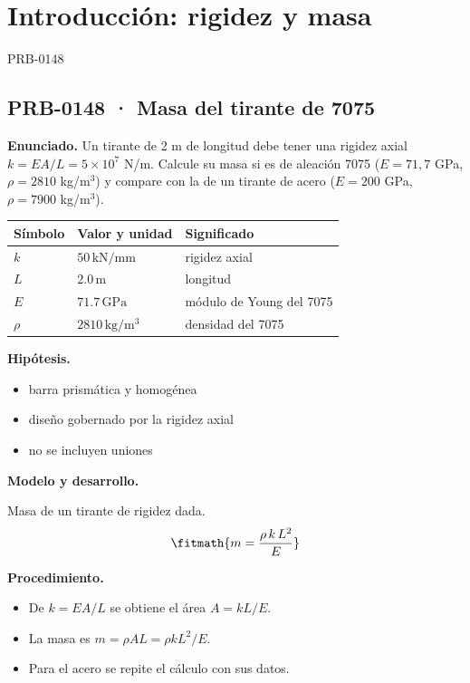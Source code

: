 \chapter{Introducción: rigidez y masa}


\Needspace{.3\textheight}

\begin{studiumworked}{PRB-0148}

\section{PRB-0148 · Masa del tirante de 7075}

\textbf{Enunciado.} Un tirante de 2 m de longitud debe tener una rigidez axial $k = EA/L = 5\times 10^{7}$ N/m. Calcule su masa si es de aleación 7075 ($E = 71{,}7$ GPa, $\rho = 2810$ kg/m$^3$) y compare con la de un tirante de acero ($E = 200$ GPa, $\rho = 7900$ kg/m$^3$).

\par\medskip\noindent\begin{tabular}{@{}p{.18\linewidth}p{.26\linewidth}p{.48\linewidth}@{}}
\toprule Símbolo & Valor y unidad & Significado\\\midrule
$k$ & $50\,\mathrm{kN/mm}$ & rigidez axial\\
$L$ & $2.0\,\mathrm{m}$ & longitud\\
$E$ & $71.7\,\mathrm{GPa}$ & módulo de Young del 7075\\
$\rho$ & $2810\,\mathrm{kg/m^3}$ & densidad del 7075\\
\bottomrule\end{tabular}\par\medskip

\textbf{Hipótesis.}\begin{itemize}\item barra prismática y homogénea
\item diseño gobernado por la rigidez axial
\item no se incluyen uniones\end{itemize}

\textbf{Modelo y desarrollo.}

Masa de un tirante de rigidez dada.\[\fitmath{m = \frac{\rho\,k\,L^{2}}{E}}\]

\textbf{Procedimiento.}\begin{itemize}\item De $k = EA/L$ se obtiene el área $A = kL/E$.
\item La masa es $m = \rho A L = \rho k L^{2}/E$.
\item Para el acero se repite el cálculo con sus datos.\end{itemize}


\end{studiumworked}
